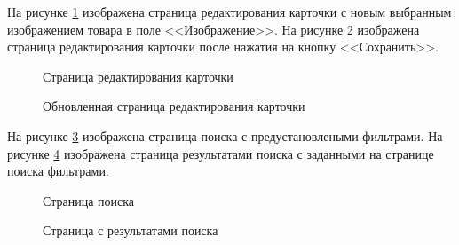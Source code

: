 На рисунке \ref{test-front5:image} изображена страница редактирования карточки с новым выбранным изображением товара в поле <<Изображение>>. На рисунке \ref{test-front6:image} изображена страница редактирования карточки после нажатия на кнопку <<Сохранить>>.

\newpage %
\begin{figure}[H] %
\caption{Страница редактирования карточки}
\label{test-front5:image}
\end{figure}

\newpage %
\begin{figure}[H] %
\caption{Обновленная страница редактирования карточки}
\label{test-front6:image}
\end{figure}

На рисунке \ref{test-front7:image} изображена страница поиска с предустановлеными фильтрами. На рисунке \ref{test-front8:image} изображена страница результатами поиска с заданными на странице поиска фильтрами.

\begin{figure}[H] %
\caption{Страница поиска}
\label{test-front7:image}
\end{figure}

\begin{figure}[H] %
\caption{Страница с результатами поиска}
\label{test-front8:image}
\end{figure}

